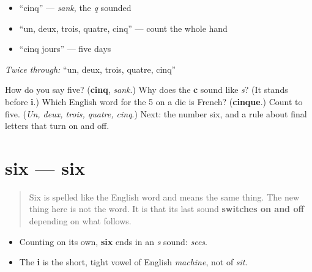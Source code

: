 \begin{itemize}
\raggedright
  \item \textquotedblleft{}cinq\textquotedblright{} — \emph{sank}, the \emph{q} sounded
  \item \textquotedblleft{}un, deux, trois, quatre, cinq\textquotedblright{} — count the whole hand
  \item \textquotedblleft{}cinq jours\textquotedblright{} — five days
\end{itemize}

\emph{Twice through:} \textquotedblleft{}un, deux, trois, quatre, cinq\textquotedblright{}

\begin{tcolorbox}[breakable,colback=teal!4,colframe=teal!35!black,title={Before you move on}]
How do you say five? (\textbf{cinq}, \emph{sank}.) Why does the \textbf{c} sound like \emph{s}? (It stands before \textbf{i}.) Which English word for the 5 on a die is French? (\textbf{cinque}.) Count to five. (\emph{Un, deux, trois, quatre, cinq}.) Next: the number six, and a rule about final letters that turn on and off.
\end{tcolorbox}
\section[six]{six — six}

\label{lesson:FR-C06-six}



\begin{quote}
Six is spelled like the English word and means the same thing. The new thing here is not the word. It is that its last sound \textbf{switches on and off} depending on what follows.
\end{quote}

\begin{sounds}
\begin{itemize}
\raggedright
  \item Counting on its own, \textbf{six} ends in an \emph{s} sound: \emph{sees}.
  \item The \textbf{i} is the short, tight vowel of English \emph{machine}, not of \emph{sit}.
\end{itemize}
\end{sounds}

